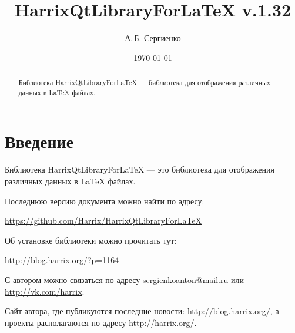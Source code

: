 \documentclass[a4paper,12pt]{article}
\title{HarrixQtLibraryForLaTeX v.1.32}
\author{А.\,Б. Сергиенко}
\date{\today}
\begin{document}


\maketitle

\begin{abstract}
Библиотека HarrixQtLibraryForLaTeX --- библиотека для отображения различных данных в LaTeX файлах.
\end{abstract}

\tableofcontents

\newpage

\section{Введение}

Библиотека HarrixQtLibraryForLaTeX --- это библиотека для отображения различных данных в LaTeX файлах.

Последнюю версию документа можно найти по адресу:

\href{https://github.com/Harrix/HarrixQtLibraryForLaTeX}{https://github.com/Harrix/HarrixQtLibraryForLaTeX}

Об установке библиотеки можно прочитать тут:

\href{http://blog.harrix.org/?p=1164}{http://blog.harrix.org/?p=1164}

С автором можно связаться по адресу \href{mailto:sergienkoanton@mail.ru}{sergienkoanton@mail.ru} или  \href{http://vk.com/harrix}{http://vk.com/harrix}.

Сайт автора, где публикуются последние новости: \href{http://blog.harrix.org/}{http://blog.harrix.org/}, а проекты располагаются по адресу \href{http://harrix.org/}{http://harrix.org/}.

\newpage
\end{document}
